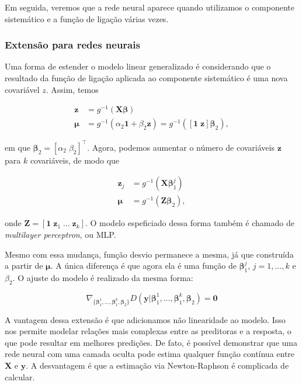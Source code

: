 \documentclass[12pt,]{report}
\begin{document}
Em seguida, veremos que a rede neural aparece quando utilizamos o
componente sistemático e a função de ligação várias vezes.

\subsubsection{Extensão para redes
neurais}\label{extensao-para-redes-neurais}

Uma forma de estender o modelo linear generalizado é considerando que o
resultado da função de ligação aplicada ao componente sistemático é uma
nova covariável \(z\). Assim, temos

\[
\begin{aligned}
\mathbf z &= g^{-1}(\mathbf X \boldsymbol \beta)\\
\boldsymbol\mu &= g^{-1}(\alpha_2\mathbf 1 + \beta_2 \mathbf z) = g^{-1}([\mathbf 1\;\mathbf z]\boldsymbol\beta_2),
\end{aligned}
\]

em que \(\boldsymbol\beta_2 = [\alpha_2\;\beta_2]^{\top}\). Agora,
podemos aumentar o número de covariáveis \(\mathbf z\) para \(k\)
covariáveis, de modo que

\[
\begin{aligned}
\mathbf z_j &= g^{-1}(\mathbf X \boldsymbol \beta_1^j)\\
\boldsymbol\mu &= g^{-1}(\mathbf Z\boldsymbol\beta_2),
\end{aligned}
\]

onde \(\mathbf Z = [\mathbf 1\;\mathbf z_1\;\dots\;\mathbf z_k]\). O
modelo espeficiado dessa forma também é chamado de \emph{multilayer
perceptron}, ou MLP.

Mesmo com essa mudança, função desvio permanece a mesma, já que
construída a partir de \(\boldsymbol \mu\). A única diferença é que
agora ela é uma função de \(\boldsymbol \beta_1^j\), \(j=1,\dots,k\) e
\(\beta_2\). O ajuste do modelo é realizado da mesma forma:

\[
\nabla_{\{\boldsymbol \beta_1^1, \dots,\boldsymbol \beta_1^k,\boldsymbol \beta_2\}} D(\mathbf y|{ \boldsymbol \beta_1^1, \dots,\boldsymbol \beta_1^k,\boldsymbol \beta_2}) = \mathbf 0
\]

A vantagem dessa extensão é que adicionamos não linearidade ao modelo.
Isso nos permite modelar relações mais complexas entre as preditoras e a
resposta, o que pode resultar em melhores predições. De fato, é possível
demonstrar que uma rede neural com uma camada oculta pode estima
qualquer função contínua entre \(\mathbf X\) e \(\mathbf y\). A
desvantagem é que a estimação via Newton-Raphson é complicada de
calcular.
\end{document}

